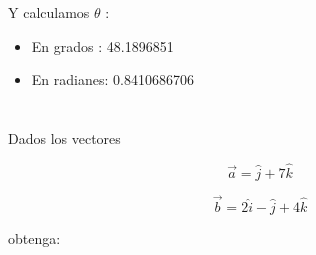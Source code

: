 \documentclass[12pt]{article}
\begin{document}
Y  calculamos $\theta$ :

\begin{itemize}
  
\item En grados : 48.1896851
  
\item En radianes: 0.8410686706
  
\end{itemize}

\section{}

Dados los vectores

\[\vec{a} = \hat{j}+ 7\hat{k}\]

\[\vec{b} = 2\hat{i} - \hat{j}+ 4\hat{k}\]

obtenga:
\end{document}
